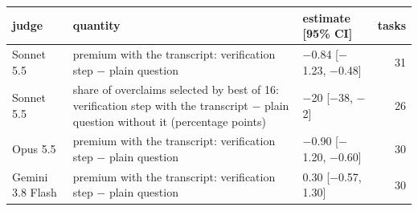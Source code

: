 {\scriptsize\setlength{\tabcolsep}{4pt}
\begin{tabular}{@{}l>{\raggedright\arraybackslash}p{9.2cm}lr@{}}
\toprule
judge & quantity & estimate [95\% CI] & tasks \\
\midrule
Sonnet 5.5 & premium with the transcript: verification step $-$ plain question & $-$0.84 [$-$1.23, $-$0.48] & 31 \\
Sonnet 5.5 & share of overclaims selected by best of 16: verification step with the transcript $-$ plain question without it (percentage points) & $-$20 [$-$38, $-$2] & 26 \\
Opus 5.5 & premium with the transcript: verification step $-$ plain question & $-$0.90 [$-$1.20, $-$0.60] & 30 \\
Gemini 3.8 Flash & premium with the transcript: verification step $-$ plain question & 0.30 [$-$0.57, 1.30] & 30 \\
\bottomrule
\end{tabular}}
